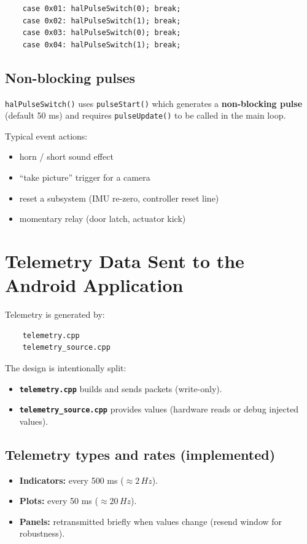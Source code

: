 \begin{verbatim}
    case 0x01: halPulseSwitch(0); break;
    case 0x02: halPulseSwitch(1); break;
    case 0x03: halPulseSwitch(0); break;
    case 0x04: halPulseSwitch(1); break;
\end{verbatim}

\subsection{Non-blocking pulses}
\texttt{halPulseSwitch()} uses \texttt{pulseStart()} which generates a \textbf{non-blocking pulse}
(default 50 ms) and requires \texttt{pulseUpdate()} to be called in the main loop.

\noindent Typical event actions:
\begin{itemize}
    \item horn / short sound effect
    \item ``take picture'' trigger for a camera
    \item reset a subsystem (IMU re-zero, controller reset line)
    \item momentary relay (door latch, actuator kick)
\end{itemize}

\section{Telemetry Data Sent to the Android Application}
\label{sec:telemetry-data}

Telemetry is generated by:

\begin{verbatim}
    telemetry.cpp
    telemetry_source.cpp
\end{verbatim}

The design is intentionally split:
\begin{itemize}
    \item \textbf{\texttt{telemetry.cpp}} builds and sends packets (write-only).
    \item \textbf{\texttt{telemetry\_source.cpp}} provides values (hardware reads or debug injected values).
\end{itemize}

\subsection{Telemetry types and rates (implemented)}
\begin{itemize}
    \item \textbf{Indicators:} every 500 ms (\(\approx 2\,Hz\)).
    \item \textbf{Plots:} every 50 ms (\(\approx 20\,Hz\)).
    \item \textbf{Panels:} retransmitted briefly when values change (resend window for robustness).
\end{itemize}


